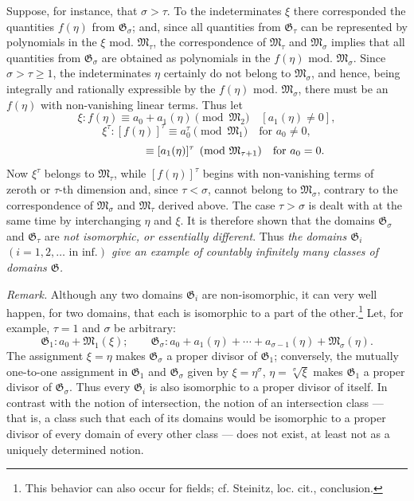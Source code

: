\documentclass[11pt]{article}
\begin{document}
Suppose, for instance, that $\sigma>\tau$. To the indeterminates $\xi$ there
corresponded the quantities $f(\eta)$ from $\mathfrak G_\sigma$; and, since all
quantities from $\mathfrak G_\tau$ can be represented by polynomials in the
$\xi$ mod. $\mathfrak M_\tau$, the correspondence of $\mathfrak M_\tau$ and
$\mathfrak M_\sigma$ implies that all quantities from $\mathfrak G_\sigma$ are
obtained as polynomials in the $f(\eta)$ mod. $\mathfrak M_\sigma$. Since
$\sigma>\tau\ge1$, the indeterminates $\eta$ certainly do not belong to
$\mathfrak M_\sigma$, and hence, being integrally and rationally expressible by
the $f(\eta)$ mod. $\mathfrak M_\sigma$, there must be an $f(\eta)$ with
non-vanishing linear terms. Thus let
\[
 \xi:f(\eta)\equiv a_0+a_1(\eta)\pmod{\mathfrak M_2}\quad[a_1(\eta)\ne0],
\]
\[
 \xi^\tau:[f(\eta)]^\tau\equiv a_0^\tau\pmod{\mathfrak M_1}\quad\text{for }a_0\ne0,
\]
\[
 \hphantom{\xi^\tau:[f(\eta)]^\tau}\equiv [a_1(\eta)]^\tau
 \pmod{\mathfrak M_{\tau+1}}\quad\text{for }a_0=0.
\]
Now $\xi^\tau$ belongs to $\mathfrak M_\tau$, while $[f(\eta)]^\tau$ begins with
non-vanishing terms of zeroth or $\tau$-th dimension and, since $\tau<\sigma$,
cannot belong to $\mathfrak M_\sigma$, contrary to the correspondence of
$\mathfrak M_\sigma$ and $\mathfrak M_\tau$ derived above. The case
$\tau>\sigma$ is dealt with at the same time by interchanging $\eta$ and $\xi$.
It is therefore shown that the domains $\mathfrak G_\sigma$ and
$\mathfrak G_\tau$ are \emph{not isomorphic, or essentially different}. Thus
\emph{the domains $\mathfrak G_i$ $(i=1,2,\ldots\text{ in inf.})$ give an
example of countably infinitely many classes of domains $\mathfrak G$.}

\emph{Remark.} Although any two domains $\mathfrak G_i$ are non-isomorphic, it
can very well happen, for two domains, that each is isomorphic to a part of the
other.\footnote{This behavior can also occur for fields; cf. Steinitz, loc.
cit., conclusion.} Let, for example, $\tau=1$ and $\sigma$ be arbitrary:
\[
\mathfrak G_1:a_0+\mathfrak M_1(\xi);\qquad
\mathfrak G_\sigma:a_0+a_1(\eta)+\cdots+a_{\sigma-1}(\eta)+\mathfrak M_\sigma(\eta).
\]
The assignment $\xi=\eta$ makes $\mathfrak G_\sigma$ a proper divisor of
$\mathfrak G_1$; conversely, the mutually one-to-one assignment in
$\mathfrak G_1$ and $\mathfrak G_\sigma$ given by
$\xi=\eta^\sigma$, $\eta=\sqrt[\sigma]{\xi}$ makes $\mathfrak G_1$ a proper
divisor of $\mathfrak G_\sigma$. Thus every $\mathfrak G_i$ is also isomorphic
to a proper divisor of itself. In contrast with the notion of intersection, the
notion of an intersection class --- that is, a class such that each of its domains
would be isomorphic to a proper divisor of every domain of every other class ---
does not exist, at least not as a uniquely determined notion.
\end{document}
